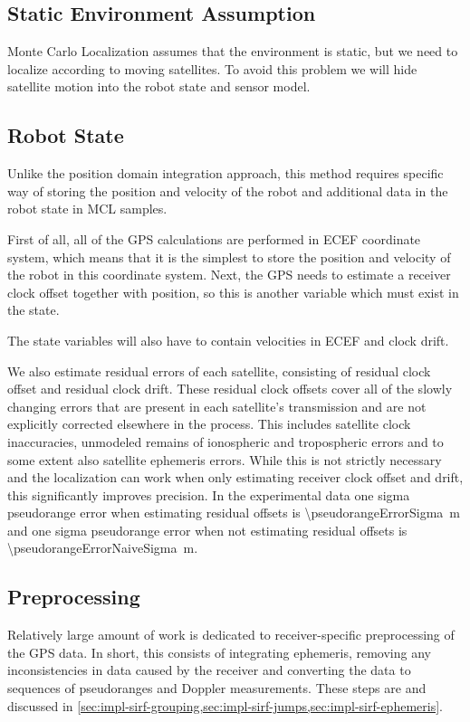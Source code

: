 \subsection{Static Environment Assumption}
\label{sec:gps-mcl-static-env}
Monte Carlo Localization assumes that the environment is static, but we need to
localize according to moving satellites.
To avoid this problem we will hide satellite motion into the robot state and sensor model.

\subsection{Robot State}
Unlike the position domain integration approach, this method requires specific
way of storing the position and velocity of the robot and
additional data in the robot state in MCL samples.

First of all, all of the GPS calculations are performed in ECEF coordinate system,
which means that it is the simplest to store the position and velocity of the robot in this coordinate system.
Next, the GPS needs to estimate a receiver clock offset together
with position, so this is another variable which must exist in the state.

The state variables will also have to contain velocities in ECEF and clock drift.

We also estimate residual errors of each satellite,
consisting of residual clock offset and residual clock drift.
These residual clock offsets cover all of the slowly changing errors that are present
in each satellite's transmission and are not explicitly corrected elsewhere in the process.
This includes satellite clock inaccuracies, unmodeled remains of ionospheric and
tropospheric errors and to some extent also satellite ephemeris errors.
While this is not strictly necessary and the localization can work when only
estimating receiver clock offset and drift, this significantly improves precision.
In the experimental data one sigma pseudorange error when estimating residual offsets is \SI{\pseudorangeErrorSigma}{\meter} and
one sigma pseudorange error when not estimating residual offsets is \SI{\pseudorangeErrorNaiveSigma}{\meter}.

\subsection{Preprocessing}
Relatively large amount of work is dedicated to receiver-specific preprocessing
of the GPS data.
In short, this consists of integrating ephemeris, removing any inconsistencies in data caused by the
receiver and converting the data to sequences of pseudoranges and Doppler measurements.
These steps are and discussed in \cref{sec:impl-sirf-grouping,sec:impl-sirf-jumps,sec:impl-sirf-ephemeris}.

